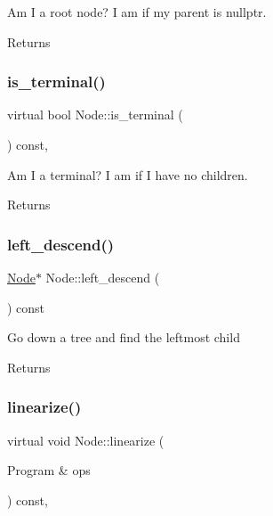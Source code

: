 Am I a root node? I am if my parent is nullptr. \begin{DoxyReturn}{Returns}

\end{DoxyReturn}
\mbox{\label{class_node_ac3c263a4e0c734c34aaf62f80f84cd9a}} 
\subsubsection{\texorpdfstring{is\+\_\+terminal()}{is\_terminal()}}
{\footnotesize\ttfamily virtual bool Node\+::is\+\_\+terminal (\begin{DoxyParamCaption}{ }\end{DoxyParamCaption}) const\hspace{0.3cm}{\ttfamily [inline]}, {\ttfamily [virtual]}}

Am I a terminal? I am if I have no children. \begin{DoxyReturn}{Returns}

\end{DoxyReturn}
\mbox{\label{class_node_ac6d1a1d71a28168b34e9092568570738}} 
\subsubsection{\texorpdfstring{left\+\_\+descend()}{left\_descend()}}
{\footnotesize\ttfamily \hyperlink{class_node}{Node}$\ast$ Node\+::left\+\_\+descend (\begin{DoxyParamCaption}{ }\end{DoxyParamCaption}) const\hspace{0.3cm}{\ttfamily [inline]}}

Go down a tree and find the leftmost child \begin{DoxyReturn}{Returns}

\end{DoxyReturn}
\mbox{\label{class_node_ac995508e96e112675fde53e7748e41bc}} 
\subsubsection{\texorpdfstring{linearize()}{linearize()}}
{\footnotesize\ttfamily virtual void Node\+::linearize (\begin{DoxyParamCaption}\item[{Program \&}]{ops }\end{DoxyParamCaption}) const\hspace{0.3cm}{\ttfamily [inline]}, {\ttfamily [virtual]}}

